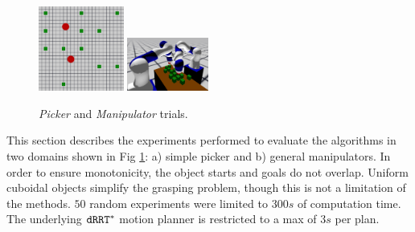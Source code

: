 %

\begin{figure}
    \vspace{-.3in}
	\centering
		\includegraphics[width=1.1in,trim={1cm 9cm 1cm 5cm},clip]{figures/simple_picker_benchmark}
		\includegraphics[width=1.05in]{figures/kuka_benchmark2}
		\vspace{-.3in}
		\caption{\textit{Picker} and \textit{Manipulator} trials.}
		\label{fig:benchmarks}
    \vspace{-.25in}
\end{figure}
This section describes the experiments performed to evaluate the algorithms in two  domains shown in Fig \ref{fig:benchmarks}: a) simple picker and b) general manipulators.
In order to ensure monotonicity, the object starts and goals do not overlap. Uniform cuboidal objects simplify the grasping problem, though this is not a limitation of the methods. $ 50 $ random experiments were limited to $300s$ of computation time. The underlying $ {\tt dRRT^*} $ motion planner is restricted to a max of $ 3s $ per plan.
